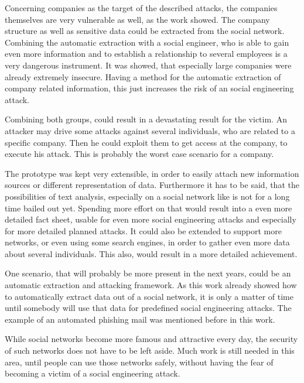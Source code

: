 Concerning companies as the target of the described attacks, the companies
themselves are very vulnerable as well, as the work showed. The company
structure as well as sensitive data could be extracted from the social network.
Combining the automatic extraction with a social engineer, who is able to gain
even more information and to establish a relationship to several employees is a
very dangerous instrument. It was showed, that especially large companies were
already extremely insecure. Having a method for the automatic extraction of
company related information, this just increases the risk of an social
engineering attack.

Combining both groups, could result in a devastating result for the victim. An
attacker may drive some attacks against several individuals, who are related to a
specific company. Then he could exploit them to get access at the company, to
execute his attack. This is probably the worst case scenario for a company.

The prototype was kept very extensible, in order to easily attach new
information sources or different representation of data. Furthermore it has to
be said, that the possibilities of text analysis, especially on a social
network like \Twitter{} is not for a long time bailed out yet. Spending more
effort on that would result into a even more detailed fact sheet, usable for
even more social engineering attacks and especially for more detailed planned
attacks. It could also be extended to support more networks, or even using
some search engines, in order to gather even more data about several
individuals. This also, would result in a more detailed achievement.

One scenario, that will probably be more present in the next years, could be an
automatic extraction and attacking framework. As this work already showed how
to automatically extract data out of a social network, it is only a matter of
time until somebody will use that data for predefined social engineering
attacks. The example of an automated phishing mail was mentioned before in
this work.

While social networks become more famous and attractive every day, the security
of such networks does not have to be left aside. Much work is still needed in
this area, until people can use those networks safely, without having the fear
of becoming a victim of a social engineering attack.
